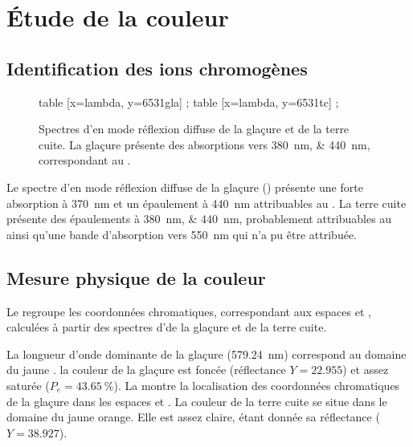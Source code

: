 \section{Étude de la couleur}

\subsection{Identification des ions chromogènes}
\begin{figure}[htb]
  \begin{plotspectre}
       table [x=lambda, y=6531gla] {\gladata} ;
       table [x=lambda, y=6531tc] {\tcdata} ;
  \end{plotspectre}
  \caption{\legendeD 
           Spectres d'\AO en mode réflexion diffuse de la glaçure et de la terre cuite. La glaçure présente des absorptions vers \SIlist{380;440}{\nm}, correspondant au .}
  \label{spectre:6531}
\end{figure}

Le spectre d'\AO en mode réflexion diffuse de la glaçure () présente une forte absorption à \SI{370}{\nm} et un épaulement à \SI{440}{\nm} attribuables au . La terre cuite présente des épaulements à \SIlist{380;440}{\nm}, probablement attribuables au  ainsi qu'une bande d'absorption vers \SI{550}{\nm} qui n'a pu être attribuée.

\subsection{Mesure physique de la couleur}
Le  regroupe les coordonnées chromatiques, correspondant aux espaces \Yxy et \Lab, calculées à partir des spectres d'\AO de la glaçure et de la terre cuite.

La longueur d'onde dominante de la glaçure (\SI{579.24}{\nm}) 
correspond au domaine du jaune \autocite{Kelly_1976}. la couleur de 
la glaçure est foncée (réflectance $Y=\num{22.955}$) et assez saturée 
($P_e=\SI{43.65}{\percent}$). La  montre la 
localisation des coordonnées chromatiques de la glaçure dans les 
espaces \Yxy et \Lab. La couleur de la terre cuite se situe dans le 
domaine du jaune orange. Elle est assez claire, étant donnée sa 
réflectance ($Y=\num{38.927}$).

